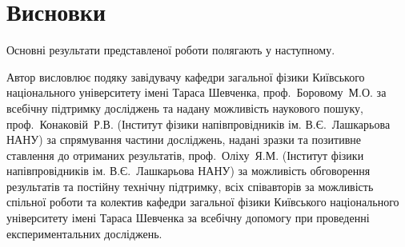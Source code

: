 \chapter*{Висновки}						%


Основні результати представленої роботи полягають у наступному.


Автор висловлює подяку
завідувачу кафедри загальної фізики Київського національного університету імені Тараса Шевченка,
проф.~Боровому~М.\:О. за всебічну підтримку досліджень та надану можливість наукового пошуку,
проф.~Конаковій~Р.\:В. (Інститут фізики напівпровідників ім. В.\:Є.~Лашкарьова НАНУ) за спрямування частини досліджень, надані зразки та позитивне ставлення до отриманих результатів,
проф.~Оліху~Я.\:М. (Інститут фізики напівпровідників ім. В.\:Є.~Лашкарьова НАНУ) за можливість обговорення результатів та постійну технічну підтримку,
всіх співавторів за можливість спільної роботи
та колектив кафедри загальної фізики Київського національного університету імені Тараса Шевченка за всебічну допомогу при проведенні експериментальних досліджень.

